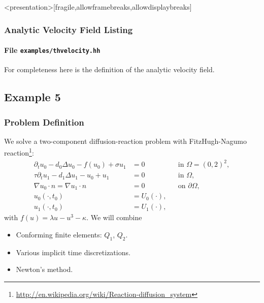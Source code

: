 \begin{frame}<presentation>[fragile,allowframebreaks,allowdisplaybreaks]
\frametitle<presentation>{Analytic Velocity Field Listing}
\framesubtitle<presentation>{File \texttt{examples/thvelocity.hh}}
For completeness here is the definition of the analytic velocity field.

\end{frame}

\subsection{Example 5}

\begin{frame}
\frametitle{Problem Definition}
We solve a two-component diffusion-reaction problem with FitzHugh-Nagumo 
reaction\footnote{\url{http://en.wikipedia.org/wiki/Reaction-diffusion_system}}:
\begin{subequations}
\begin{align*}
\partial_t u_0 - d_0 \Delta u_0 - f(u_0) + \sigma u_1 &= 0 &&\text{in $\Omega=(0,2)^2$},\\
\tau\partial_t u_1 - d_1 \Delta u_1 - u_0 + u_1 &= 0 &&\text{in $\Omega$},\\
\nabla u_0 \cdot n = \nabla u_1 \cdot n &= 0 &&\text{on $\partial\Omega$},\\
u_0(\cdot,t_0) &= U_0(\cdot), \\ 
u_1(\cdot,t_0) &= U_1(\cdot),
\end{align*}
\end{subequations}
with $f(u) = \lambda u - u^3 - \kappa$.
We will combine
\begin{itemize}
\item Conforming finite elements: $Q_1$, $Q_2$.
\item Various implicit time discretizations.
\item Newton's method.
\end{itemize}
\end{frame}

